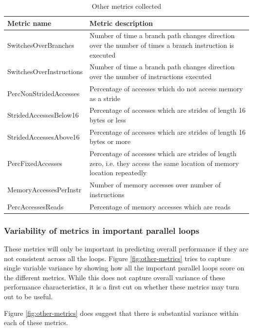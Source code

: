 \documentclass[12pt,twoside]{reedthesis}
\begin{document}
		
		\begin{table}
			\caption{Other metrics collected}
			\label{table:metric-names}
			\begin{tabular}{ |p{4.5cm}|p{11cm}| }
				\hline
				Metric name & Metric description \\
				\hline \hline
				SwitchesOverBranches & Number of time a branch path changes direction over the number of times a branch instruction is executed \\ \hline
				SwitchesOverInstructions & Number of time a branch path changes direction over the number of instructions executed \\ \hline
				PercNonStridedAccesses & Percentage of accesses which do not access memory as a stride \\ \hline
				StridedAccessesBelow16 & Percentage of accesses which are strides of length 16 bytes or less \\ \hline
				StridedAccessesAbove16 &  Percentage of accesses which are strides of length 16 bytes or more \\ \hline
				PercFixedAccesses & Percentage of accesses which are strides of length zero, i.e. they access the same location of memory location repeatedly \\ \hline
				MemoryAccessesPerInstr & Number of memory accesses over number of instructions \\ \hline
				PercAccessesReads & Percentage of memory accesses which are reads  \\ \hline
			\end{tabular}
		\end{table}
		
		\subsubsection{Variability of metrics in important parallel loops}
		
		These metrics will only be important in predicting overall performance if they are not consistent across all the loops. Figure \ref{fig:other-metrics} tries to capture single variable variance by showing how all the important parallel loops score on the different metrics. While this does not capture overall variance of these performance characteristics, it is a first cut on whether these metrics may turn out to be useful. 
		
		Figure \ref{fig:other-metrics} does suggest that there is substantial variance within each of these metrics.
		
\end{document}
